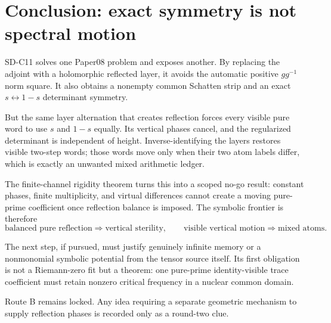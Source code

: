 \section{Conclusion: exact symmetry is not spectral motion}
\label{sec:conclusion}

SD-C11 solves one Paper08 problem and exposes another.  By replacing the
adjoint with a holomorphic reflected layer, it avoids the automatic positive
$gg^{-1}$ norm square.  It also obtains a nonempty common Schatten strip and
an exact $s\leftrightarrow1-s$ determinant symmetry.

But the same layer alternation that creates reflection forces every visible
pure word to use $s$ and $1-s$ equally.  Its vertical phases cancel, and the
regularized determinant is independent of height.  Inverse-identifying the
layers restores visible two-step words; those words move only when their two
atom labels differ, which is exactly an unwanted mixed arithmetic ledger.

The finite-channel rigidity theorem turns this into a scoped no-go result:
constant phases, finite multiplicity, and virtual differences cannot create a
moving pure-prime coefficient once reflection balance is imposed.  The
symbolic frontier is therefore
\[
 \boxed{
 \text{balanced pure reflection}\Rightarrow\text{vertical sterility},
 \qquad
 \text{visible vertical motion}\Rightarrow\text{mixed atoms}.}
\]

The next step, if pursued, must justify genuinely infinite memory or a
nonmonomial symbolic potential from the tensor source itself.  Its first
obligation is not a Riemann-zero fit but a theorem: one pure-prime
identity-visible trace coefficient must retain nonzero critical frequency in
a nuclear common domain.

Route B remains locked.  Any idea requiring a separate geometric mechanism
to supply reflection phases is recorded only as a round-two clue.
